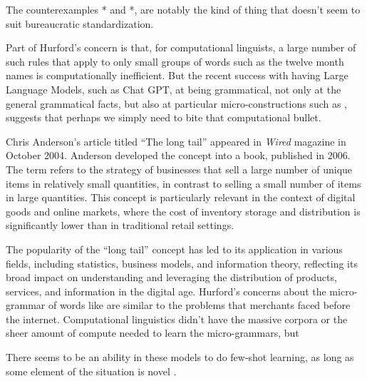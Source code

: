 The counterexamples * and *, are notably the kind of thing that doesn't seem to suit bureaucratic standardization.

Part of Hurford's concern is that, for computational linguists, a large number of such rules that apply to only small groups of words such as the twelve month names is computationally inefficient. But the recent success with having Large Language Models, such as Chat GPT, at being grammatical, not only at the general grammatical facts, but also at particular micro-constructions such as , suggests that perhaps we simply need to bite that computational bullet.

\bigskip

Chris Anderson's article titled \enquote{The long tail} appeared in \textit{Wired} magazine in October 2004. Anderson developed the concept into a book, published in 2006. The term  refers to the strategy of businesses that sell a large number of unique items in relatively small quantities, in contrast to selling a small number of items in large quantities. This concept is particularly relevant in the context of digital goods and online markets, where the cost of inventory storage and distribution is significantly lower than in traditional retail settings.

The popularity of the \enquote{long tail} concept has led to its application in various fields, including statistics, business models, and information theory, reflecting its broad impact on understanding and leveraging the distribution of products, services, and information in the digital age. Hurford's concerns about the micro-grammar of words like  are similar to the problems that merchants faced before the internet. Computational linguistics didn't have the massive corpora or the sheer amount of compute needed to learn the micro-grammars, but %



There seems to be an ability in these models to do few-shot learning, as long as some element of the situation is novel \citep{Liu2019}. %


